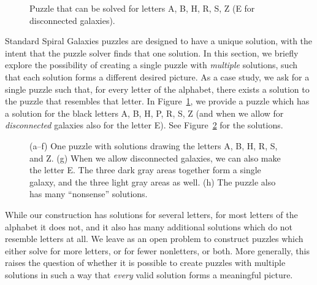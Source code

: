 \begin{figure}
\centering
{}
  \caption{\small Puzzle that can be solved for letters A, B, H, R, S, Z (E for disconnected galaxies). 
}
  \label{fig:letter-puzzle}
\end{figure}

Standard Spiral Galaxies puzzles are designed to have a unique solution, with the intent that the puzzle solver finds that one solution.
In this section, we briefly explore the possibility of creating a single puzzle with \emph{multiple} solutions, such that each solution forms a different desired picture.
As a case study, we ask for a single puzzle such that, for every letter of the alphabet, there exists a solution to the puzzle that resembles that letter.
In Figure~\ref{fig:letter-puzzle}, we provide a puzzle which has a solution for the black letters A, B, H, P, R, S, Z (and when we allow for \emph{disconnected} galaxies also for the letter E). 
See Figure~\ref{fig:letter-puzzle-sol} for the solutions.

\begin{figure}
\centering
{}
 \caption{\small (a--f) One puzzle with solutions drawing the letters A, B, H, R, S, and Z. (g) When we allow disconnected galaxies, we can also make the letter E. The three dark gray areas together form a single galaxy, and the three light gray areas as well. (h) The puzzle also has many ``nonsense'' solutions.}
  \label{fig:letter-puzzle-sol}
\end{figure}

While our construction has solutions for several letters, for most letters of the alphabet it does not, and it also has many additional solutions which do not resemble letters at all.
We leave as an open problem to construct puzzles which either solve for more letters, or for fewer nonletters, or both.
More generally, this raises the question of whether it is possible to create puzzles with multiple solutions in such a way that \emph{every} valid solution forms a meaningful picture.

